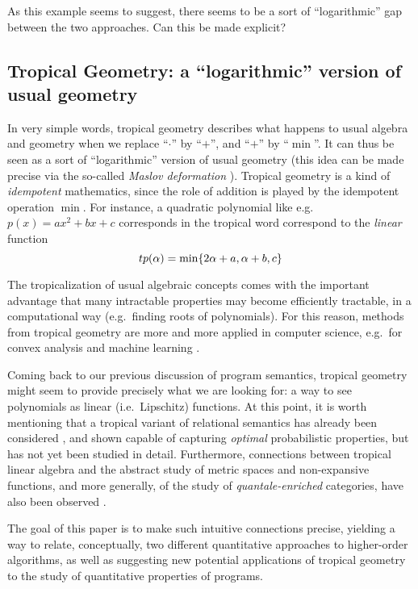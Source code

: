 As this example seems to suggest, there seems to be a sort of ``logarithmic'' gap between the two approaches. Can this be made explicit?



\subsection{Tropical Geometry: a ``logarithmic'' version of usual geometry} 

In very simple words, tropical geometry describes what happens to usual algebra and geometry when we replace ``$\cdot$'' by  ``$+$'', and ``$+$'' by ``$\min$''. It can thus be seen as a sort of ``logarithmic'' version of usual geometry (this idea can be made precise via the so-called \emph{Maslov deformation} \cite{}).
Tropical geometry is a kind of \emph{idempotent} mathematics, since the role of addition is 
played by the idempotent operation $\min$.
For instance, a quadratic polynomial like e.g.~$p(x)=ax^{2}+bx+c$ corresponds in the tropical word correspond to the \emph{linear} function
$$
\trop p(\alpha)=\min\{2\alpha + a, \alpha+b, c\}
$$ 

The tropicalization of usual algebraic concepts comes with the important advantage that many intractable properties may become efficiently tractable, in a computational way (e.g.~finding roots of polynomials). For this reason, methods from tropical geometry are more and more applied in computer science, e.g.~for convex analysis and machine learning \cite{}.

Coming back to our previous discussion of program semantics, tropical geometry might seem to provide precisely what we are looking for: a way to see polynomials as linear (i.e.~Lipschitz) functions.
At this point, it is worth mentioning that a tropical variant of relational semantics has already been considered \cite{}, and shown capable of capturing \emph{optimal} probabilistic properties, but has not yet been studied in detail. Furthermore, connections between tropical linear algebra and the abstract study of metric spaces and non-expansive functions, and more generally, of the study of \emph{quantale-enriched} categories, have also been observed \cite{}.

The goal of this paper is to make such intuitive connections precise, yielding a way to relate, conceptually, two different quantitative approaches to higher-order algorithms, as well as suggesting new potential applications of tropical geometry to the study of quantitative properties of programs.


